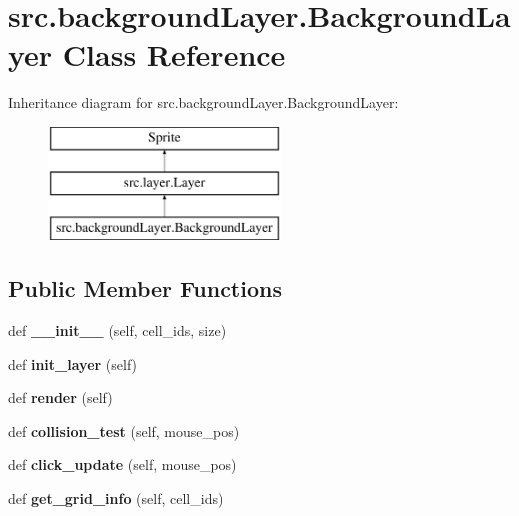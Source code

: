 \hypertarget{classsrc_1_1background_layer_1_1_background_layer}{}\section{src.\+background\+Layer.\+Background\+Layer Class Reference}
\label{classsrc_1_1background_layer_1_1_background_layer}
Inheritance diagram for src.\+background\+Layer.\+Background\+Layer\+:\begin{figure}[H]
\begin{center}
\leavevmode
\includegraphics[height=3.000000cm]{classsrc_1_1background_layer_1_1_background_layer}
\end{center}
\end{figure}
\subsection*{Public Member Functions}
\begin{DoxyCompactItemize}
\item 
\hypertarget{classsrc_1_1background_layer_1_1_background_layer_a38ce0868e1db7d3f5571ea778d07e87e}{}\label{classsrc_1_1background_layer_1_1_background_layer_a38ce0868e1db7d3f5571ea778d07e87e} 
def {\bfseries \+\_\+\+\_\+init\+\_\+\+\_\+} (self, cell\+\_\+ids, size)
\item 
\hypertarget{classsrc_1_1background_layer_1_1_background_layer_ad7f4e024623fe4b87208913800b4202d}{}\label{classsrc_1_1background_layer_1_1_background_layer_ad7f4e024623fe4b87208913800b4202d} 
def {\bfseries init\+\_\+layer} (self)
\item 
\hypertarget{classsrc_1_1background_layer_1_1_background_layer_a6fe83ed503dbec41aeb00a048ac4b255}{}\label{classsrc_1_1background_layer_1_1_background_layer_a6fe83ed503dbec41aeb00a048ac4b255} 
def {\bfseries render} (self)
\item 
\hypertarget{classsrc_1_1background_layer_1_1_background_layer_a74fcbbd1faeb08bd2df1395786ced677}{}\label{classsrc_1_1background_layer_1_1_background_layer_a74fcbbd1faeb08bd2df1395786ced677} 
def {\bfseries collision\+\_\+test} (self, mouse\+\_\+pos)
\item 
\hypertarget{classsrc_1_1background_layer_1_1_background_layer_a6d585d9f8502a3acda740834d8d45cfa}{}\label{classsrc_1_1background_layer_1_1_background_layer_a6d585d9f8502a3acda740834d8d45cfa} 
def {\bfseries click\+\_\+update} (self, mouse\+\_\+pos)
\item 
\hypertarget{classsrc_1_1background_layer_1_1_background_layer_a0cbb6a2a45a489e1310aa3fad3d1d936}{}\label{classsrc_1_1background_layer_1_1_background_layer_a0cbb6a2a45a489e1310aa3fad3d1d936} 
def {\bfseries get\+\_\+grid\+\_\+info} (self, cell\+\_\+ids)
\end{DoxyCompactItemize}
